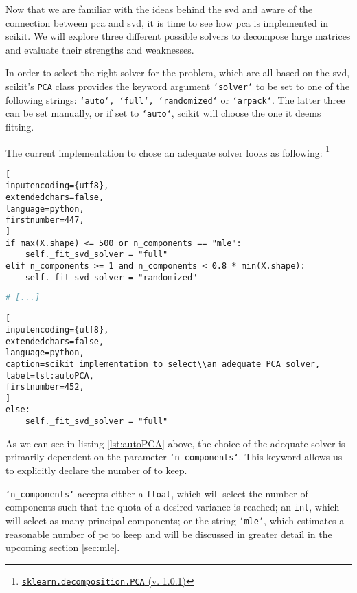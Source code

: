 Now that we are familiar with the ideas behind the \gls{svd} and aware of the connection between \gls{pca} and \gls{svd}, it is time to see how \gls{pca} is implemented in \gls{scikit}.
We will explore three different possible solvers to decompose large matrices and evaluate their strengths and weaknesses.
\bigskip



In order to select the right solver for the problem, which are all based on the \gls{svd}, \gls{scikit}'s \texttt{PCA} class provides the keyword argument \texttt{`solver`} to be set to one of the following strings: \texttt{`auto`, `full`, `randomized`} or \texttt{`arpack`}.
The latter three can be set manually, or if set to \texttt{`auto`}, scikit will choose the one it deems fitting.
\bigskip

The current implementation to chose an adequate solver looks as following:%
\footnote{\href{\scikitPCAvIxOxI{_pca}}{\texttt{sklearn.decomposition.PCA} (v. 1.0.1)}}






\begin{lstlisting}[
inputencoding={utf8}, 
extendedchars=false, 
language=python,
firstnumber=447,
]
if max(X.shape) <= 500 or n_components == "mle":
    self._fit_svd_solver = "full"
elif n_components >= 1 and n_components < 0.8 * min(X.shape):
    self._fit_svd_solver = "randomized"
\end{lstlisting}
%
%
%
\spacingConcatLists
\begin{lstlisting}[language=python, numbers=none]
# [...]
\end{lstlisting}
%
%
%
\spacingConcatLists
\begin{lstlisting}[
inputencoding={utf8}, 
extendedchars=false, 
language=python, 
caption=scikit implementation to select\\an adequate PCA solver, 
label=lst:autoPCA,
firstnumber=452,
]
else:
    self._fit_svd_solver = "full"
\end{lstlisting}


\medskip\noindent
As we can see in listing \ref{lst:autoPCA} above, the choice of the adequate solver is primarily dependent on the parameter \texttt{`n\_components`}.
This keyword allows us to explicitly declare the number of  to keep.

\texttt{`n\_components`} accepts either a \texttt{float}, which will select the number of components such that the quota of a desired variance is reached; an \texttt{int}, which will select as many principal components; or the string \texttt{`mle`}, which estimates a reasonable number of \gls{pc} to keep and will be discussed in greater detail in the upcoming section \ref{sec:mle}.
\bigskip


